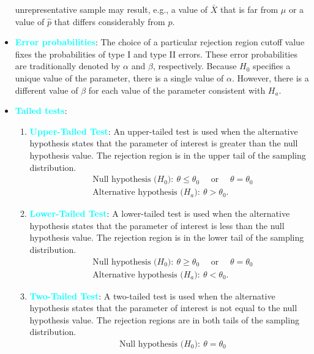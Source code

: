 \documentclass{report}
\begin{document}
\begin{itemize}
unrepresentative sample may result, e.g., a value of $\bar{X}$ that is far from $\mu$ or a value of $\hat{p}$ that differs considerably from $p$.
\item \textbf{\textcolor{cyan}{Error probabilities}}:
    The choice of a particular rejection region cutoff value fixes the probabilities of type I and type II errors. These error probabilities are traditionally denoted by \( \alpha \) and \( \beta \), respectively. Because \( H_0 \) specifies a unique value of the parameter, there is a single value of \( \alpha \). However, there is a different value of \( \beta \) for each value of the parameter consistent with \( H_a \).
\item \textbf{\textcolor{cyan}{Tailed tests}}:
    \begin{enumerate}
        \item \textbf{\textcolor{cyan}{Upper-Tailed Test}}: An upper-tailed test is used when the alternative hypothesis states that the parameter of interest is greater than the null hypothesis value. The rejection region is in the upper tail of the sampling distribution.
            \begin{align*}
                &\text{Null hypothesis ($H_{0}$)}:\ \theta \leq \theta_{0} \quad \text{ or } \quad \theta  = \theta_{0} \\
                &\text{Alternative hypothesis ($H_{a}$)}:\ \theta > \theta_{0} 
            .\end{align*}
        \item \textbf{\textcolor{cyan}{Lower-Tailed Test}}: A lower-tailed test is used when the alternative hypothesis states that the parameter of interest is less than the null hypothesis value. The rejection region is in the lower tail of the sampling distribution.
            \begin{align*}
                &\text{Null hypothesis ($H_{0}$)}:\ \theta \geq \theta_{0} \quad \text{ or } \quad \theta  = \theta_{0} \\
                &\text{Alternative hypothesis ($H_{a}$)}:\ \theta < \theta_{0} 
            .\end{align*}
        \item \textbf{\textcolor{cyan}{Two-Tailed Test}}:
            A two-tailed test is used when the alternative hypothesis states that the parameter of interest is not equal to the null hypothesis value. The rejection regions are in both tails of the sampling distribution.
            \begin{align*}
                &\text{Null hypothesis ($H_{0}$)}:\ \theta  = \theta_{0} \\

\end{align*}
\end{enumerate}
\end{itemize}
\end{document}
